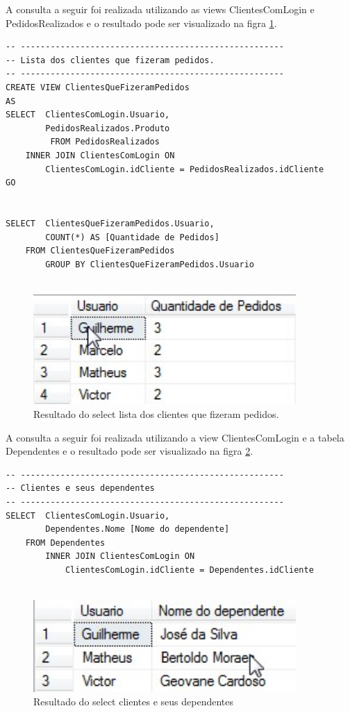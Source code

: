 \documentclass[
	12pt,				%
	openright,			%
	oneside,			%
	a4paper,			%
	chapter=TITLE,		%
	section=TITLE,		%
	english,			%
	brazil				%
	]{abntex2}
\begin{document}
    A consulta a seguir foi realizada utilizando as views ClientesComLogin e PedidosRealizados
    e o resultado pode ser visualizado na figra \ref{select05}.
    \begin{lstlisting}
-- -----------------------------------------------------
-- Lista dos clientes que fizeram pedidos.
-- -----------------------------------------------------
CREATE VIEW ClientesQueFizeramPedidos
AS
SELECT	ClientesComLogin.Usuario,
		PedidosRealizados.Produto
		 FROM PedidosRealizados
	INNER JOIN ClientesComLogin ON 
	    ClientesComLogin.idCliente = PedidosRealizados.idCliente
GO


SELECT  ClientesQueFizeramPedidos.Usuario, 
        COUNT(*) AS [Quantidade de Pedidos] 
    FROM ClientesQueFizeramPedidos 
	    GROUP BY ClientesQueFizeramPedidos.Usuario
    
    \end{lstlisting}
    \begin{figure}[h]
         \centering
         \includegraphics[width=10cm,keepaspectratio]{Imgs/Select_005}
         \caption{Resultado do select lista dos clientes que fizeram pedidos.}
         \label{select05}
    \end{figure}
    
    \newpage
    
    A consulta a seguir foi realizada utilizando a view ClientesComLogin e a tabela Dependentes 
    e o resultado pode ser visualizado na figra \ref{select06}.    
    \begin{lstlisting}
-- -----------------------------------------------------
-- Clientes e seus dependentes
-- -----------------------------------------------------
SELECT  ClientesComLogin.Usuario, 
        Dependentes.Nome [Nome do dependente] 
    FROM Dependentes
	    INNER JOIN ClientesComLogin ON 
	        ClientesComLogin.idCliente = Dependentes.idCliente
    
    \end{lstlisting}
    \begin{figure}[h]
         \centering
         \includegraphics[width=10cm,keepaspectratio]{Imgs/Select_006}
         \caption{Resultado do select clientes e seus dependentes} 
         \label{select06}
    \end{figure}
\end{document}
